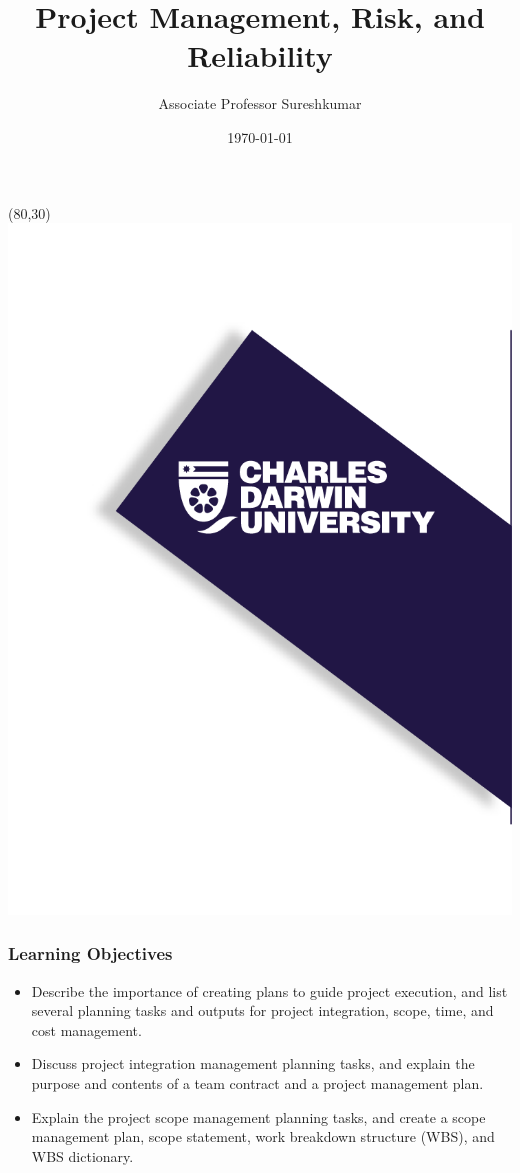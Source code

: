 \documentclass{beamer}
\title[PRT551 - Lecture 4]{Project Management, Risk, and Reliability} %
\author{Associate Professor Sureshkumar} %
\institute[CDU] %
{
Charles Darwin University \\ %
\medskip
\textit{cdux@cdu.edu.au} %
}
\date{\today} %
\begin{document}
\begin{frame}
\titlepage %
\begin{textblock}{20}(80,30)
      \includegraphics[scale=0.8]{logo_1.png}
\end{textblock}
\end{frame}





\begin{frame}
\frametitle{Learning Objectives}
\begin{itemize}
\item Describe the importance of creating plans to guide project execution, and list several planning tasks and outputs for project integration, scope, time, and cost management.
\vspace{0.3cm}
\item Discuss project integration management planning tasks, and explain the purpose and contents of a team contract and a project management plan.
\vspace{0.3cm}
\item Explain the project scope management planning tasks, and create a scope management plan, scope statement, work breakdown structure (WBS), and WBS dictionary.
\end{itemize}
\end{frame}
\end{document}
